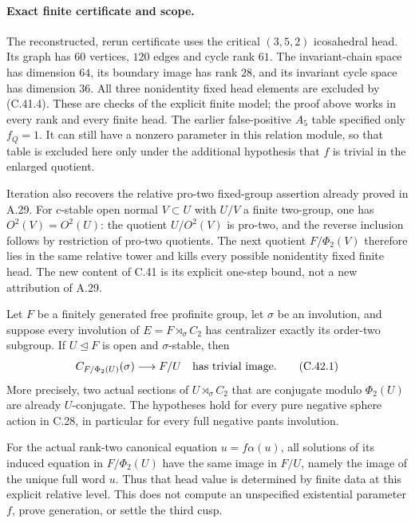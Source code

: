 \paragraph{Exact finite certificate and scope.}
The reconstructed, rerun certificate
uses the critical $(3,5,2)$ icosahedral head. Its graph has $60$
vertices, $120$ edges and cycle rank $61$. The invariant-chain
space has dimension $64$, its boundary image has rank $28$, and
its invariant cycle space has dimension $36$. All three
nonidentity fixed head elements are excluded by (C.41.4).
These are checks of the explicit finite model; the proof above
works in every rank and every finite head.
The earlier false-positive $A_5$ table specified only $f_Q=1$.
It can still have a nonzero parameter in this relation module,
so that table is excluded here only under the additional hypothesis
that $f$ is trivial in the enlarged quotient.

Iteration also recovers the relative pro-two fixed-group assertion
already proved in A.29. For $c$-stable open normal $V\subset U$
with $U/V$ a finite two-group, one has $O^2(V)=O^2(U)$: the quotient
$U/O^2(V)$ is pro-two, and the reverse inclusion follows by
restriction of pro-two quotients. The next quotient
$F/\Phi_2(V)$ therefore lies in the same relative tower and kills
every possible nonidentity fixed finite head. The new content of
C.41 is its explicit one-step bound, not a new attribution of A.29.

Let $F$ be a finitely generated free profinite group, let $\sigma$
be an involution, and suppose every involution of
$E=F\rtimes_\sigma C_2$ has centralizer exactly its order-two
subgroup. If $U\trianglelefteq F$ is open and $\sigma$-stable, then
\[
 C_{F/\Phi_2(U)}(\sigma)\longrightarrow F/U
                    \quad\hbox{has trivial image}.              \tag{C.42.1}
\]
More precisely, two actual sections of $U\rtimes_\sigma C_2$
that are conjugate modulo $\Phi_2(U)$ are already $U$-conjugate.
The hypotheses hold for every pure negative sphere action in
C.28, in particular for every full negative pants involution.

For the actual rank-two canonical equation $u=f\alpha(u)$,
all solutions of its induced equation in $F/\Phi_2(U)$ have the
same image in $F/U$, namely the image of the unique full word $u$.
Thus that head value is determined by finite data at this explicit
relative level. This does not compute an unspecified existential
parameter $f$, prove generation, or settle the third cusp.

